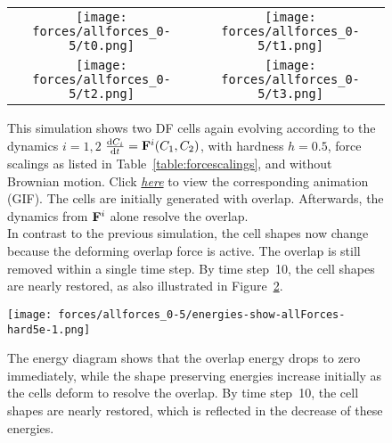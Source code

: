 \begin{figure}[h!]
    \centering
    \begin{tabular}{cc}
        \texttt{[image: forces/allforces\_0-5/t0.png]} &
        \texttt{[image: forces/allforces\_0-5/t1.png]} \\
        \texttt{[image: forces/allforces\_0-5/t2.png]} &
        \texttt{[image: forces/allforces\_0-5/t3.png]} \\
    \end{tabular}
    \caption{
			This simulation shows two DF cells again evolving according to the dynamics $i=1,2$ $\frac{\mathrm{d} C_i}{\mathrm{d} t} = \mathbf{F}^i(C_1, C_2)$, with hardness $h=0.5$, force scalings as listed in Table~\ref{table:forcescalings}, and without Brownian motion.
			Click \href{https://github.com/tivo476c/FlexibleCellModel/blob/master/figures/gifs/showForces/show-allForces-hard5e-1.gif}{\textit{here}} to view the corresponding animation (GIF).
			The cells are initially generated with overlap. 
			Afterwards, the dynamics from $\mathbf{F}^i$ alone resolve the overlap.\\
			In contrast to the previous simulation, the cell shapes now change because the deforming overlap force is active. 
			The overlap is still removed within a single time step. 
			By time step~10, the cell shapes are nearly restored, as also illustrated in Figure~\ref{fig:allForces-halfEnergyDiagram}.
			}
	\label{fig:allForces-half} 
\end{figure}

\begin{figure}[h!]
    \centering
        \texttt{[image: forces/allforces\_0-5/energies-show-allForces-hard5e-1.png]} 
    \caption{The energy diagram shows that the overlap energy drops to zero immediately, while the shape preserving energies increase initially as the cells deform to resolve the overlap.
			 By time step~10, the cell shapes are nearly restored, which is reflected in the decrease of these energies.}
	\label{fig:allForces-halfEnergyDiagram}
\end{figure}


